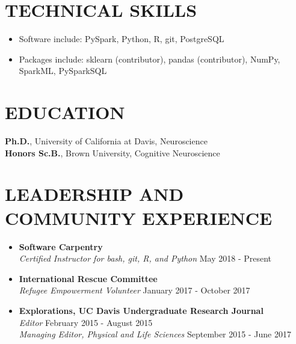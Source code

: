 \documentclass[line,margin,10pt]{res}
\begin{document}
\begin{resume}
 \section{TECHNICAL SKILLS} 
 \begin{itemize}[leftmargin=-2pt] \itemsep -2pt
\item [] Software include: PySpark, Python, R, git, PostgreSQL
\item []Packages include: sklearn (contributor), pandas (contributor), NumPy, SparkML, PySparkSQL%
 \end{itemize}


\section{EDUCATION} 
\textbf{Ph.D.}, University of California at Davis, Neuroscience\\
\textbf{Honors Sc.B.}, Brown University, Cognitive Neuroscience\\
 
\section{LEADERSHIP AND COMMUNITY EXPERIENCE}
\begin{itemize}\itemsep -2pt

\item [] \textbf{Software Carpentry} \\ {\sl Certified Instructor for bash, git, R, and Python} \hfill May 2018 - Present

\item [] \textbf{International Rescue Committee} \\ {\sl Refugee Empowerment Volunteer} \hfill January 2017 - October 2017

\item [] \textbf{Explorations, UC Davis Undergraduate Research Journal} \\
{\sl Editor} \hfill February 2015 - August 2015\\
{\sl Managing Editor, Physical and Life Sciences} \hfill September 2015 - June 2017
  

\end{itemize}
\end{resume}
\end{document}
